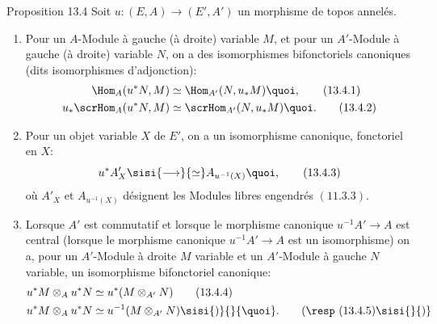 \documentclass[10pt]{../fichiers-configuration-latex/smfart}
\begin{document}
\begin{enonce*}{Proposition 13.4}
Soit $u:(E,A)\rightarrow (E',A')$ un morphisme de topos annelés.
\begin{enumerate}
\renewcommand{\theenumi}{\alph{enumi}}
\renewcommand{\labelenumi}{\theenumi)}
\item Pour un $A$-Module à gauche (\resp à droite) variable $M$, et
pour un $A'$-Module à gauche (\resp à droite) variable $N$, on a des
isomorphismes bifonctoriels canoniques (dits isomorphismes
d'adjonction):
\begin{align*}
\Hom_A(u^{\ast}N,M) &\simeq
\Hom_{A'}(N,u_{\ast}M){\quoi},\tag{13.4.1}\\
u_{\ast}\scrHom_A(u^{\ast}N,M) &\simeq
\scrHom_{A'}(N,u_{\ast}M){\quoi}.\tag{13.4.2}
\end{align*}

\item Pour un objet variable $X$ de $E'$, on a un isomorphisme
canonique, fonctoriel en $X$:
\begin{equation*}
u^{\ast}A'_X\sisi{\longrightarrow}{\simeq} A_{u^{-1}(X)}{\quoi},\tag{13.4.3}
\end{equation*}
où $A'_X$ et $A_{u^{-1}(X)}$ désignent les Modules libres engendrés
$(\hyperref[IV.prop11.3.3]{11.3.3})$.

\item Lorsque $A'$ est commutatif et lorsque le morphisme canonique
$u^{-1}A'\rightarrow A$ est central (\resp lorsque le morphisme
canonique $u^{-1}A'\rightarrow A$ est un isomorphisme) on a, pour un
$A'$-Module à droite $M$ variable et un $A'$-Module à gauche $N$
variable, un isomorphisme bifonctoriel canonique:
\begin{align*}
u^{\ast}M\otimes_A u^{\ast}N &\simeq
u^{\ast}(M\otimes_{A'}N)\tag{13.4.4}\\
u^{\ast}M\otimes_A u^{\ast}N &\simeq
u^{-1}(M\otimes_{A'}N)\sisi{)}{}{\quoi}.\tag*{(\resp (13.4.5)\sisi{}{)}}
\end{align*}
\end{enumerate}
\end{enonce*}
\end{document}
